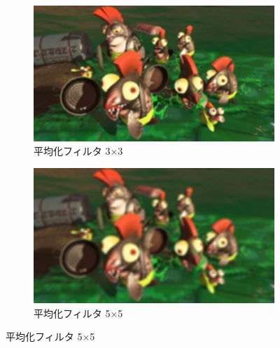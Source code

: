 \documentclass[a4paper,11pt,titlepage]{jsarticle}
\begin{document}
\begin{figure}[htbp]
  \centering

  \begin{subfigure}{0.4\textwidth}
    \includegraphics[width=\linewidth]{syake_filter3x3.png}
    \caption{平均化フィルタ 3×3}
  \end{subfigure}
  \hfill
  \begin{subfigure}{0.4\textwidth}
    \includegraphics[width=\linewidth]{syake_filter5x5.png}
    \caption{平均化フィルタ 5×5}
  \end{subfigure}

  \vspace{2mm}


\end{figure}
\end{document}
